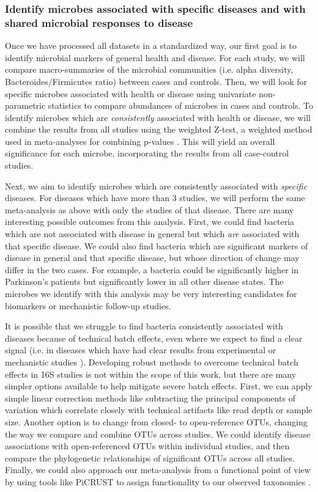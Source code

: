 \documentclass[12pt]{article}
\begin{document}
\subsubsection{Identify microbes associated with specific diseases and with shared microbial responses to disease}\label{sec:indep_studies}
Once we have processed all datasets in a standardized way, our first 
goal is to identify microbial markers of general health and disease. 
For each study, we will compare macro-summaries of the microbial communities
(i.e. alpha diversity, Bacteroides/Firmicutes ratio) between cases and controls.
Then, we will look for specific microbes associated with health or disease using
univariate non-parametric statistics to compare abundances of microbes in cases
and controls. To identify microbes which are \textit{consistently} associated with
health or disease, we will combine the results from all studies using 
the weighted Z-test, a weighted method used in meta-analyses for combining p-values \cite{zavkin-ztest-2011}. 
This will yield an overall significance for each microbe,
incorporating the results from all case-control studies.

Next, we aim to identify microbes which are consistently associated with \textit{specific}
diseases. For diseases which have more than 3 studies, we will
perform the same meta-analysis as above with only the studies
of that disease. There are many interesting possible outcomes from this analysis.
First, we could find bacteria which are not associated with disease in general 
but which \textit{are} associated with that specific disease. 
We could also find bacteria which are significant markers of disease in general and 
that specific disease, but whose direction of change may differ in the two cases.
For example, a bacteria could be significantly higher in Parkinson's patients but
significantly lower in all other disease states. The microbes we identify with this
analysis may be very interesting candidates for biomarkers or mechanistic follow-up studies.

It is possible that we struggle to find bacteria consistently 
associated with diseases because of technical batch effects, even 
where we expect to find a clear signal (i.e. in diseases which have 
had clear results from experimental or mechanistic studies \cite{turnbaugh-energy_harvest-2006, ridaura-mouse_fmt-2013, crc_zeller}). 
Developing robust methods to overcome technical batch effects in 16S 
studies is not within the scope of this work, but there are many
simpler options available to help mitigate severe batch effects. 
First, we can apply simple linear correction methods 
like subtracting the principal components of variation which correlate closely with technical 
artifacts like read depth or sample size. 
Another option is to change from closed- to open-reference OTUs, changing the way we compare and combine OTUs across studies.
We could identify disease associations with open-referenced OTUs within individual studies, and then compare 
the phylogenetic relationships of significant OTUs across all studies. 
Finally, we could also approach our meta-analysis from a functional point of view by
using tools like PiCRUST to assign functionality to our
observed taxonomies \cite{langille-picrust-2013}.
\end{document}
